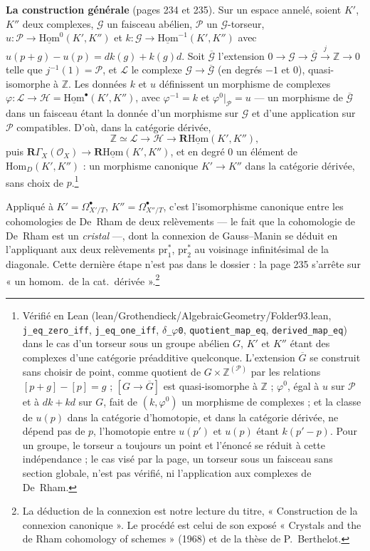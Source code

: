 \documentclass[11pt,a4paper]{article}
\begin{document}
\textbf{La construction générale} (pages 234 et 235). Sur un espace annelé,
soient $K'$, $K''$ deux complexes, $\mathcal{G}$ un faisceau abélien,
$\mathcal{P}$ un $\mathcal{G}$-torseur, $u : \mathcal{P} \to
\underline{\mathrm{Hom}}^0(K', K'')$ et $k : \mathcal{G} \to
\underline{\mathrm{Hom}}^{-1}(K',K'')$ avec $u(p+g) - u(p) = dk(g) + k(g)d$. Soit
$\overline{\mathcal{G}}$ l'extension $0 \to \mathcal{G} \to \overline{\mathcal{G}}
\xrightarrow{j} \mathbb{Z} \to 0$ telle que $j^{-1}(1) = \mathcal{P}$, et
$\mathcal{L}$ le complexe $\mathcal{G} \to \overline{\mathcal{G}}$ (en degrés $-1$
et $0$), quasi-isomorphe à $\mathbb{Z}$. Les données $k$ et $u$ définissent un
morphisme de complexes $\varphi : \mathcal{L} \to \mathcal{H} =
\underline{\mathrm{Hom}}^\bullet(K',K'')$, avec $\varphi^{-1} = k$ et
$\varphi^0|_{\mathcal{P}} = u$ — un morphisme de $\overline{\mathcal{G}}$ dans un
faisceau étant la donnée d'un morphisme sur $\mathcal{G}$ et d'une application
sur $\mathcal{P}$ compatibles. D'où, dans la catégorie dérivée,
\[
  \mathbb{Z} \simeq \mathcal{L} \longrightarrow \mathcal{H} \longrightarrow
  \mathbf{R}\underline{\mathrm{Hom}}(K',K''),
\]
puis $\mathbf{R}\Gamma_X(\mathcal{O}_X) \to \mathbf{R}\underline{\mathrm{Hom}}(K',K'')$, et
en degré $0$ un élément de $\mathrm{Hom}_{D}(K', K'')$ : un morphisme canonique
$K' \to K''$ dans la catégorie dérivée, sans choix de $p$.\footnote{Vérifié
en Lean (lean/Grothendieck/AlgebraicGeometry/Folder93.lean, \texttt{j\_eq\_zero\_iff},
\texttt{j\_eq\_one\_iff}, \texttt{$\delta$\_$\varphi$0},
\texttt{quotient\_map\_eq}, \texttt{derived\_map\_eq}) dans le cas d'un
torseur sous un groupe abélien $G$, $K'$ et $K''$ étant des complexes d'une
catégorie préadditive quelconque. L'extension $\overline{G}$ se construit sans
choisir de point, comme quotient de $G \times \mathbb{Z}^{(\mathcal{P})}$ par les
relations $[p + g] - [p] = g$ ; $[G \to \overline{G}]$ est quasi-isomorphe à
$\mathbb{Z}$ ; $\varphi^0$, égal à $u$ sur $\mathcal{P}$ et à $dk + kd$ sur $G$,
fait de $(k, \varphi^0)$ un morphisme de complexes ; et la classe de $u(p)$ dans
la catégorie d'homotopie, et dans la catégorie dérivée, ne dépend pas de $p$,
l'homotopie entre $u(p')$ et $u(p)$ étant $k(p' - p)$. Pour un groupe, le
torseur a toujours un point et l'énoncé se réduit à cette indépendance ; le cas
visé par la page, un torseur sous un faisceau sans section globale, n'est pas
vérifié, ni l'application aux complexes de De~Rham.}

Appliqué à $K' = \Omega^\bullet_{X'/T}$, $K'' = \Omega^\bullet_{X''/T}$, c'est
l'isomorphisme canonique entre les cohomologies de De~Rham de deux
relèvements — le fait que la cohomologie de De~Rham est un \emph{cristal} —,
dont la connexion de Gauss--Manin se déduit en l'appliquant aux deux
relèvements $\mathrm{pr}_1^*$, $\mathrm{pr}_2^*$ au voisinage infinitésimal de
la diagonale. Cette dernière étape n'est pas dans le dossier : la page 235
s'arrête sur « un homom.\ de la cat.\ dérivée ».\footnote{La déduction de la
connexion est notre lecture du titre, « Construction de la connexion
canonique ». Le procédé est celui de son exposé « Crystals and the de Rham
cohomology of schemes » (1968) et de la thèse de P.~Berthelot.}
\end{document}
